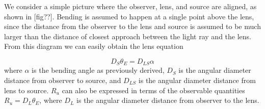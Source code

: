 We consider a simple picture where the observer, lens, and source are aligned, as shown in [fig??]. Bending is assumed to happen at a single point above the lens, since the distance from the observer to the lens and source is assumed to be much larger than the distance of closest approach between the light ray and the lens. From this diagram we can easily obtain the lens equation \citep{schneider1992gravitationallenses}

\begin{equation}
  D_S \theta_E = D_{LS} \alpha
  \label{eq:lens-eqn}
\end{equation}
where $\alpha$ is the bending angle as previously derived, $D_S$ is the angular diameter distance from observer to source, and $D_{LS}$ is the angular diameter distance from lens to source. $R_u$ can also be expressed in terms of the observable quantities $R_u = D_L \theta_E$, where $D_L$ is the angular diameter distance from observer to the lens.  
